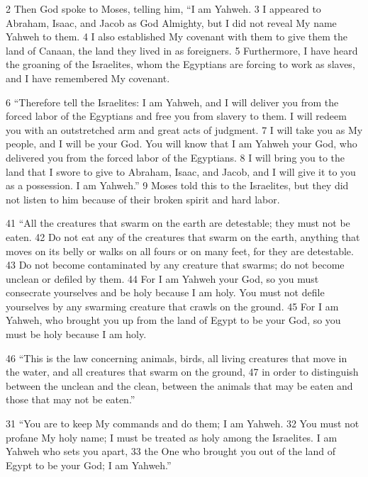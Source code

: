 \begin{bible}
2 Then God spoke to Moses, telling him, ``I am Yahweh.  3 I appeared to Abraham, Isaac, and Jacob as God Almighty, but I did not reveal My name Yahweh to them.  4 I also established My covenant with them to give them the land of Canaan, the land they lived in as foreigners.  5 Furthermore, I have heard the groaning of the Israelites, whom the Egyptians are forcing to work as slaves, and I have remembered My covenant.

6 ``Therefore tell the Israelites: I am Yahweh, and I will deliver you from the forced labor of the Egyptians and free you from slavery to them. I will redeem you with an outstretched arm and great acts of judgment.  7 I will take you as My people, and I will be your God. You will know that I am Yahweh your God, who delivered you from the forced labor of the Egyptians.  8 I will bring you to the land that I swore to give to Abraham, Isaac, and Jacob, and I will give it to you as a possession. I am Yahweh.''  9 Moses told this to the Israelites, but they did not listen to him because of their broken spirit and hard labor.


41 ``All the creatures that swarm on the earth are detestable; they must not be eaten.  42 Do not eat any of the creatures that swarm on the earth, anything that moves on its belly or walks on all fours or on many feet, for they are detestable.  43 Do not become contaminated by any creature that swarms; do not become unclean or defiled by them.  44 For I am Yahweh your God, so you must consecrate yourselves and be holy because I am holy. You must not defile yourselves by any swarming creature that crawls on the ground.  45 For I am Yahweh, who brought you up from the land of Egypt to be your God, so you must be holy because I am holy.

46 ``This is the law concerning animals, birds, all living creatures that move in the water, and all creatures that swarm on the ground,  47 in order to distinguish between the unclean and the clean, between the animals that may be eaten and those that may not be eaten.''


31 ``You are to keep My commands and do them; I am Yahweh.  32 You must not profane My holy name; I must be treated as holy among the Israelites. I am Yahweh who sets you apart,  33 the One who brought you out of the land of Egypt to be your God; I am Yahweh.''

\end{bible}

